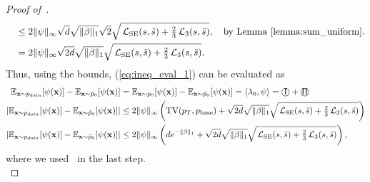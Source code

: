 \documentclass{article} %
\def\eqref#1{equation~\ref{#1}}
\newcommand{\bfx}{{\bf x}}
\newcommand{\TV}{\mathrm{TV}}
\newcommand{\cI}{\text{\textcircled{I}}}
\newcommand{\cII}{\text{\textcircled{II}}}
\newcommand{\LSE}{\mathcal{L}_{\mathrm{SE}}}
\renewcommand{\eqref}[1]{\textup{(\ref{#1})}}
\newcommand{\LThree}{\mathcal{L}_{3}}
\begin{document}
\begin{proof}[Proof of~]
\begin{align*}
    \quad &\leq 2 \| \psi \|_\infty \sqrt{d} \sqrt{\|\beta \|_1}  \sqrt{2} \sqrt{\,\LSE(s, \tilde{s}) + \tfrac{2}{3}\,\LThree(s, \tilde{s})}, \quad \text{by Lemma~\ref{lemma:sum_uniform}.} \\
    \quad & = 2 \| \psi \|_\infty \sqrt{2d} \sqrt{\|\beta \|_1}  \sqrt{\,\LSE(s, \tilde{s}) + \tfrac{2}{3}\,\LThree(s, \tilde{s})}.
\end{align*}
Thus, 
using the bounds, \eqref{eq:ineq_eval_1} can be evaluated as
\begin{align}
    \mathbb{E}_{\bfx \sim p_{\mathrm{data}}}[\psi(\bfx)] - \mathbb{E}_{\bfx \sim \tilde{p}_0}[\psi(\bfx)]  &=  \mathbb{E}_{\bfx \sim p_{0}}[\psi(\bfx)] - \mathbb{E}_{\bfx \sim \tilde{p}_0}[\psi(\bfx)] = \langle \lambda_0, \psi \rangle = \cI + \cII \nonumber \\
    \left| \mathbb{E}_{\bfx \sim p_{\mathrm{data}}}[\psi(\bfx)] - \mathbb{E}_{\bfx \sim \tilde{p}_0}[\psi(\bfx)] \right| &\leq 2 \|\psi\|_\infty \left( \TV(p_T, p_{\rm base}) +  \sqrt{2d} \sqrt{\|\beta \|_1}  \sqrt{\,\LSE(s, \tilde{s}) + \tfrac{2}{3}\,\LThree(s, \tilde{s})} \right) \nonumber \\
    \left| \mathbb{E}_{\bfx \sim p_{\mathrm{data}}}[\psi(\bfx)] - \mathbb{E}_{\bfx \sim \tilde{p}_0}[\psi(\bfx)] \right| &\leq 2 \|\psi\|_\infty \left( d e^{-\| \beta \|_1} +  \sqrt{2d} \sqrt{\|\beta \|_1}  \sqrt{\,\LSE(s, \tilde{s}) + \tfrac{2}{3}\,\LThree(s, \tilde{s})} \right), \nonumber 
\end{align}
where we used~ in the last step. \\


\end{proof}
\end{document}
